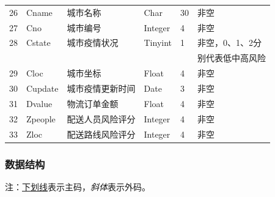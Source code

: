 \documentclass[12pt]{article}
\begin{document}
\begin{center}
\begin{supertabular}{llllll}
	26 &	Cname &	城市名称 &	Char &	30 	& 非空 \\
	27 &	Cno &	城市编号 &	Integer &	4 &	非空 \\
	28 &	Cstate &	城市疫情状况 &	Tinyint &	1 &	 非空，0、1、2分\\ &&&&& 别代表低中高风险 \\
	29 &	Cloc &	城市坐标 &	Float &	4 &	非空 \\
	30 &	Cupdate &	城市疫情更新时间 &	Date &	3 &	非空 \\
	31 &	Dvalue 	& 物流订单金额 	& Float &	4 &	非空 \\
	32 &	Zpeople & 配送人员风险评分 & Integer & 4 & 非空 \\
	33 &	Zloc & 配送路线风险评分 & Integer & 4 & 非空 \\
\end{supertabular}
\end{center}

\newpage
\subsubsection{数据结构}

注：\underline{下划线}表示主码，\textit{斜体}表示外码。

\tabletail{\bottomrule}
\end{document}
